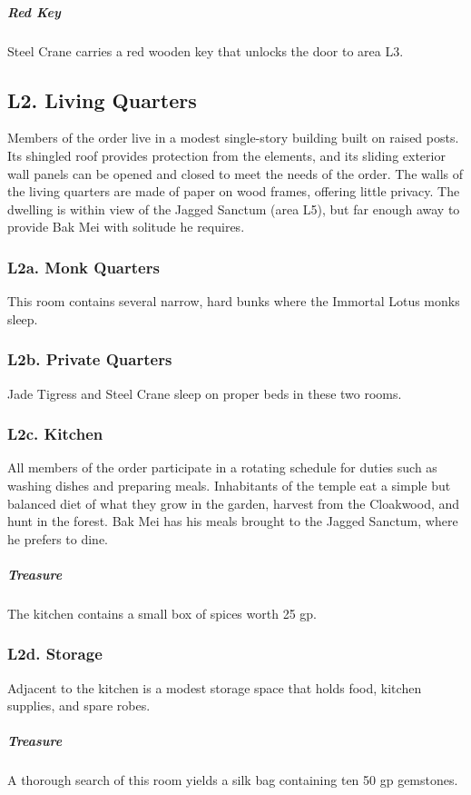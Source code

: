 \documentclass[10pt,a4paper,twoside,bg=print,twocolumn,openany,nodeprecatedcode]{dndbook}
\begin{document}
\subparagraph{Red Key}
Steel Crane carries a red wooden key that unlocks the door to area L3.

\subsection{L2. Living Quarters}
Members of the order live in a modest single-story building built on raised posts. Its shingled roof provides protection from the elements, and its sliding exterior wall panels can be opened and closed to meet the needs of the order. The walls of the living quarters are made of paper on wood frames, offering little privacy. The dwelling is within view of the Jagged Sanctum (area L5), but far enough away to provide Bak Mei with solitude he requires.

\subsubsection{L2a. Monk Quarters}
This room contains several narrow, hard bunks where the Immortal Lotus monks sleep.

\subsubsection{L2b. Private Quarters}
Jade Tigress and Steel Crane sleep on proper beds in these two rooms.

\subsubsection{L2c. Kitchen}
All members of the order participate in a rotating schedule for duties such as washing dishes and preparing meals. Inhabitants of the temple eat a simple but balanced diet of what they grow in the garden, harvest from the Cloakwood, and hunt in the forest. Bak Mei has his meals brought to the Jagged Sanctum, where he prefers to dine.

\subparagraph{Treasure}
The kitchen contains a small box of spices worth 25 gp.

\subsubsection{L2d. Storage}
Adjacent to the kitchen is a modest storage space that holds food, kitchen supplies, and spare robes.

\subparagraph{Treasure}
A thorough search of this room yields a silk bag containing ten 50 gp gemstones.
\end{document}
